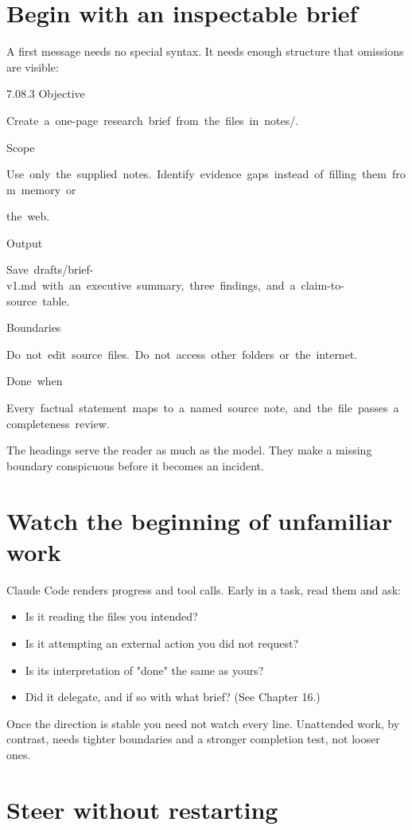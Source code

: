 \documentclass[11pt,a4paper,twoside,openany]{book}
\newcommand{\cl}[1]{\noindent\mbox{#1}\par}
\begin{document}
\FloatBarrier
\setcounter{section}{0}
\section{Begin with an inspectable brief}

A first message needs no special syntax. It needs enough structure that omissions are visible:


\begin{codeblock}{7.0}{8.3}
\cl{Objective}
\cl{Create~a~one-page~research~brief~from~the~files~in~notes/.}
\cl{}
\cl{Scope}
\cl{Use~only~the~supplied~notes.~Identify~evidence~gaps~instead~of~filling~them~from~memory~or}
\cl{the~web.}
\cl{}
\cl{Output}
\cl{Save~drafts/brief-v1.md~with~an~executive~summary,~three~findings,~and~a~claim-to-source~table.}
\cl{}
\cl{Boundaries}
\cl{Do~not~edit~source~files.~Do~not~access~other~folders~or~the~internet.}
\cl{}
\cl{Done~when}
\cl{Every~factual~statement~maps~to~a~named~source~note,~and~the~file~passes~a~completeness~review.}
\end{codeblock}

The headings serve the reader as much as the model. They make a missing boundary conspicuous before it becomes an incident.


\FloatBarrier
\setcounter{section}{1}
\section{Watch the beginning of unfamiliar work}

Claude Code renders progress and tool calls. Early in a task, read them and ask:


\begin{itemize}
\item Is it reading the files you intended?
\item Is it attempting an external action you did not request?
\item Is its interpretation of "done" the same as yours?
\item Did it delegate, and if so with what brief? (See Chapter 16.)
\end{itemize}

Once the direction is stable you need not watch every line. Unattended work, by contrast, needs tighter boundaries and a stronger completion test, not looser ones.


\FloatBarrier
\setcounter{section}{2}
\section{Steer without restarting}
\end{document}
